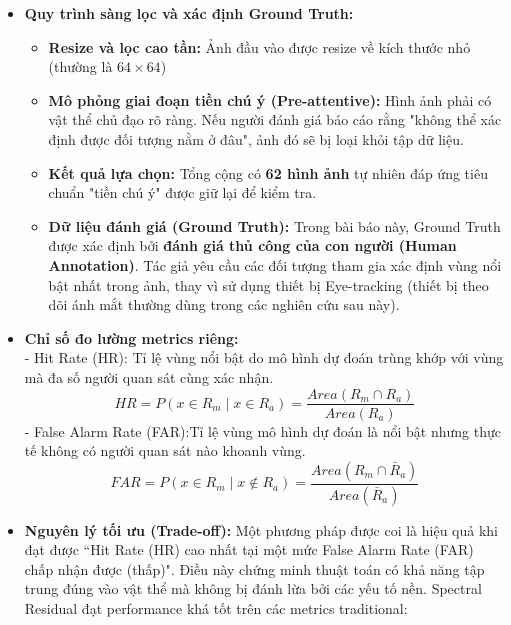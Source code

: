 \begin{itemize}
    \item \textbf{Quy trình sàng lọc và xác định Ground Truth:}
    \begin{itemize}
        \item \textbf{Resize và lọc cao tần:} Ảnh đầu vào được resize về kích thước nhỏ (thường là \textbf{$64 \times 64$})
        \item \textbf{Mô phỏng giai đoạn tiền chú ý (Pre-attentive):} Hình ảnh phải có vật thể chủ đạo rõ ràng. Nếu người đánh giá báo cáo rằng "không thể xác định được đối tượng nằm ở đâu", ảnh đó sẽ bị loại khỏi tập dữ liệu.
        \item \textbf{Kết quả lựa chọn:} Tổng cộng có \textbf{62 hình ảnh} tự nhiên đáp ứng tiêu chuẩn "tiền chú ý" được giữ lại để kiểm tra.
        \item \textbf{Dữ liệu đánh giá (Ground Truth):} Trong bài báo này, Ground Truth được xác định bởi \textbf{đánh giá thủ công của con người (Human Annotation)}. Tác giả yêu cầu các đối tượng tham gia xác định vùng nổi bật nhất trong ảnh, thay vì sử dụng thiết bị Eye-tracking (thiết bị theo dõi ánh mắt thường dùng trong các nghiên cứu sau này).
    \end{itemize}

    \item \textbf{Chỉ số đo lường metrics riêng:}\\
    - Hit Rate (HR): Tỉ lệ vùng nổi bật do mô hình dự đoán trùng khớp với vùng mà đa số người quan sát cùng xác nhận.
    \begin{equation} HR = P(x \in R_m \mid x \in R_a) = \frac{Area(R_m \cap R_a)}{Area(R_a)} \end{equation}
    - False Alarm Rate (FAR):Tỉ lệ vùng mô hình dự đoán là nổi bật nhưng thực tế không có người quan sát nào khoanh vùng.
    \begin{equation} FAR = P(x \in R_m \mid x \notin R_a) = \frac{Area(R_m \cap \bar{R}_a)}{Area(\bar{R}_a)} \end{equation}

    \item \textbf{Nguyên lý tối ưu (Trade-off):} 
    Một phương pháp được coi là hiệu quả khi đạt được ``Hit Rate (HR) cao nhất tại một mức False Alarm Rate (FAR) chấp nhận được (thấp)". Điều này chứng minh thuật toán có khả năng tập trung đúng vào vật thể mà không bị đánh lừa bởi các yếu tố nền.
    Spectral Residual đạt performance khá tốt trên các metrics traditional:
\end{itemize}

